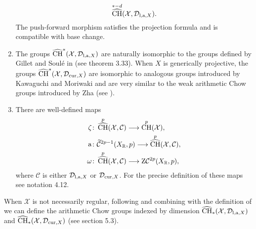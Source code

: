 \documentclass[10pt,twoside]{article}
\numberwithin{equation}{section}
\theoremstyle{plain}
\theoremstyle{definition}
\DeclareMathOperator{\cha}{\widehat{CH}}
\DeclareMathOperator{\CH}{CH}
\DeclareMathOperator{\amap}{a}
\newcommand{\cc}{{\mathcal{C}}}
\newcommand{\las}{{\text{\rm l,a}}}
\newcommand{\D}{\text{{\rm cur}}}
\begin{document}
\begin{enumerate}
\begin{displaymath}
    \cha^{\ast-d}(\mathcal{X},\mathcal{D}_{\las,X}).    
  \end{displaymath}
  The push-forward morphism satisfies the projection
  formula and is compatible with base change.
\item The groups $\cha^{\ast}(\mathcal{X},\mathcal{D}_{\las,X})$ are naturally
  isomorphic to the groups defined by Gillet and Soul\'e in
  \cite{GilletSoule:ait} (see \cite{BurgosKramerKuehn:accavb} theorem
  3.33).
  When $X$ is
  generically projective, the groups
  $\cha^{\ast}(\mathcal{X},\mathcal{D}_{\D,X})$ are isomorphic to analogous
  groups introduced by Kawaguchi and Moriwaki
  \cite{KawaguchiMoriwaki:isfav} and are very similar to the weak
  arithmetic Chow groups introduced by Zha (see
  \cite{Burgos:MR2384539}).
\item There are well-defined maps
\begin{align*}
\zeta&\colon \cha^{p}(\mathcal{X},\cc)\longrightarrow\CH^{p}(\mathcal{X}),\\  
\amap&\colon \widetilde{\cc}^{2p-1}(X_{\mathbb{R}},p)\longrightarrow\cha^{p}
(\mathcal{X},\cc),\\
\omega&\colon \cha^{p}(\mathcal{X},\cc)\longrightarrow{\rm
  Z}\cc^{2p}(X_{\mathbb{R}},p),
\end{align*}  
where $\cc$ is either $\mathcal{D}_{\las,X}$ or $\mathcal{D}_{\D,X}$.
For the precise definition of these maps see
\cite{BurgosKramerKuehn:cacg} notation 4.12. 
\end{enumerate}

When $\mathcal{X}$ is not necessarily regular, following 
\cite{GilletSoule:aRRt} and combining with the definition of
\cite{BurgosKramerKuehn:cacg} we can define the arithmetic Chow
groups indexed by dimension
$\cha_{\ast}(\mathcal{X},\mathcal{D}_{\las,X})$ and 
$\cha_{\ast}(\mathcal{X},\mathcal{D}_{\D,X})$ (see
\cite{BurgosKramerKuehn:accavb} section 5.3). 
\end{document}
